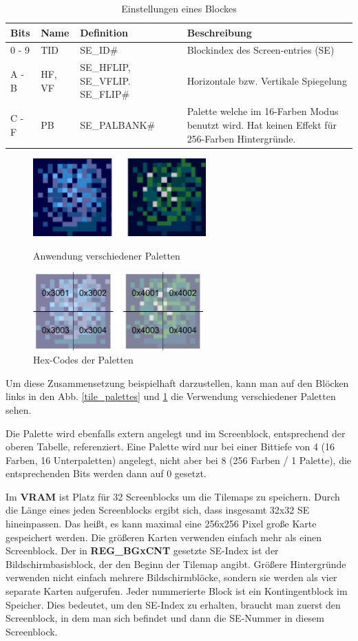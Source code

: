 \begin{table}[H]
\centering
\begin{tabular}{|p{1cm}|p{1cm}|p{4cm}|p{9cm}|}
\hline
\textbf{Bits} & \textbf{Name} & \textbf{Definition} & \textbf{Beschreibung} \\ \hline
0 - 9 & TID & SE\_ID\# & Blockindex des Screen-entries (SE) \\ \hline
A - B & HF, VF & SE\_HFLIP, SE\_VFLIP. SE\_FLIP\# & Horizontale bzw. Vertikale Spiegelung \\ \hline
C - F & PB & SE\_PALBANK\# & Palette welche im 16-Farben Modus benutzt wird. Hat keinen Effekt für 256-Farben Hintergründe. \\ \hline
\end{tabular}
\caption{Einstellungen eines Blockes \citep{tile}}
\label{tile_memory}
\end{table}

\begin{figure}
	\includegraphics[height=30mm]{img/tiles_palette.png}
	\caption{Anwendung verschiedener Paletten}
	\label{tile_palettes}
	\includegraphics[height=30mm]{img/tiles_palette_quarter.png}
	\caption{Hex-Codes der Paletten}
	\label{tile_palettes_hex}
\end{figure}
Um diese Zusammensetzung beispielhaft darzustellen, kann man auf den Blöcken links in den Abb. \ref{tile_palettes} und \ref{tile_palettes_hex} die Verwendung verschiedener Paletten sehen. 

Die Palette wird ebenfalls extern angelegt und im Screenblock, entsprechend der oberen Tabelle, referenziert. Eine Palette wird nur bei einer Bittiefe von 4 (16 Farben, 16 Unterpaletten) angelegt, nicht aber bei 8 (256 Farben / 1 Palette), die entsprechenden Bits werden dann auf 0 gesetzt. 

Im \textbf{\ac{VRAM}} ist Platz für 32 Screenblocks um die Tilemaps zu speichern. Durch die Länge eines jeden Screenblocks ergibt sich, dass insgesamt 32x32 \ac{SE} hineinpassen. Das heißt, es kann maximal eine 256x256 Pixel große Karte gespeichert werden. \citep{gbatek} Die größeren Karten verwenden einfach mehr als einen Screenblock. Der in \textbf{REG\_BGxCNT} gesetzte \ac{SE}-Index ist der Bildschirmbasisblock, der den Beginn der Tilemap angibt. Größere Hintergründe verwenden nicht einfach mehrere Bildschirmblöcke, sondern sie werden als vier separate Karten aufgerufen. Jeder nummerierte Block ist ein Kontingentblock im Speicher. Dies bedeutet, um den \ac{SE}-Index zu erhalten, braucht man zuerst den Screenblock, in dem man sich befindet und dann die \ac{SE}-Nummer in diesem Screenblock. \citep{tile}

